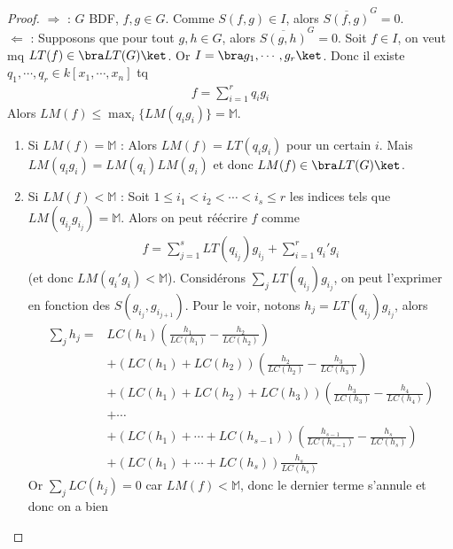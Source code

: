         \begin{proof}
            $\Rightarrow$ : $G$ BDF, $f,g \in G$. Comme $S(f,g) \in I$, alors $\overline{S(f,g)}^G = 0$. \\
            $\Leftarrow$ : Supposons que pour tout $g,h \in G$, alors $\overline{S(g,h)}^G = 0$. Soit $f \in I$, on veut mq $LT(f) \in \bra LT(G) \ket$. Or $I = \bra g_1, \cdots, g_r \ket$. Donc il existe $q_1, \cdots, q_r \in k[x_1, \cdots, x_n]$ tq 
            \begin{align*}
                f = \sum_{i = 1}^r q_ig_i
            \end{align*}
            Alors $LM(f) \leq \max_i \{LM(q_ig_i)\} = \mathbb{M}$.
            \begin{enumerate}
                \item Si $LM(f) = \mathbb{M}$ : Alors $LM(f) = LT(q_ig_i)$ pour un certain $i$. Mais $LM(q_ig_i) = LM(q_i)LM(g_i)$ et donc $LM(f) \in \bra LT(G) \ket$.
                \item Si $LM(f) < \mathbb{M}$ : Soit $1 \leq i_1 < i_2 < \cdots < i_s \leq r$ les indices tels que $LM(q_{i_j}g_{i_j}) = \mathbb{M}$. Alors on peut réécrire $f$ comme
                \begin{align*}
                    f = \sum_{j = 1}^s LT(q_{i_j})g_{i_j} + \sum_{i = 1}^r q_i'g_i
                \end{align*}
                (et donc $LM(q_i'g_i) < \mathbb{M}$). Considérons $\sum_j LT(q_{i_j})g_{i_j}$, on peut l'exprimer en fonction des $S(g_{i_j}, g_{i_{j+1}})$. Pour le voir, notons $h_j = LT(q_{i_j})g_{i_j}$, alors
                \begin{align*}
                    \sum_j h_j = &LC(h_1)\left( \frac{h_1}{LC(h_1)} - \frac{h_2}{LC(h_2)} \right) \\
                    &+ (LC(h_1) + LC(h_2))\left( \frac{h_2}{LC(h_2)} - \frac{h_3}{LC(h_3)} \right) \\
                    &+ (LC(h_1) + LC(h_2) + LC(h_3))\left( \frac{h_3}{LC(h_3)} - \frac{h_4}{LC(h_4)} \right) \\
                    & + \cdots \\
                    &+(LC(h_1) + \cdots + LC(h_{s-1}))\left( \frac{h_{s-1}}{LC(h_{s-1})} - \frac{h_s}{LC(h_s)} \right) \\
                    &+ (LC(h_1) + \cdots + LC(h_s))\frac{h_s}{LC(h_s)}
                \end{align*}
                Or $\sum_j LC(h_j) = 0$ car $LM(f) < \mathbb{M}$, donc le dernier terme s'annule et donc on a bien

\end{enumerate}
\end{proof}
